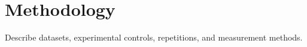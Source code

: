 \section{Methodology}
Describe datasets, experimental controls, repetitions, and measurement methods.
